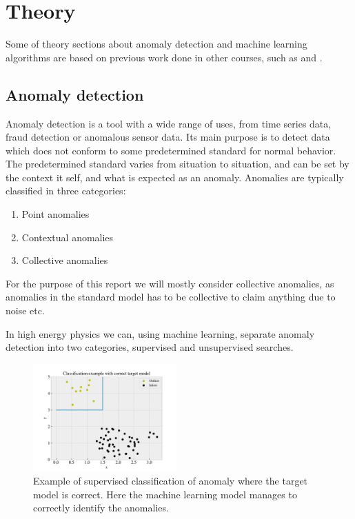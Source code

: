 \documentclass[ reprint, amsmath,amssymb, aps, nofootinbib]{revtex4-2}
\begin{document}
\section{Theory}
Some of theory sections about anomaly detection and machine learning algorithms are based on previous work done in other courses, such as \cite{FYSSTK} and \cite{ML_PROJ}.

\subsection{Anomaly detection}

Anomaly detection is a tool with a wide range of uses, from time series data, fraud detection or anomalous sensor data. Its main purpose is to detect data which does not conform to some predetermined standard for normal behavior. The predetermined standard varies from situation to situation, and can be set by the context it self, and what is expected as an anomaly. Anomalies are typically classified in three categories\cite{anom_detec}:
\begin{enumerate}
    \item Point anomalies
    \item Contextual anomalies
    \item Collective anomalies
\end{enumerate}

For the purpose of this report we will mostly consider collective anomalies, as anomalies in the standard model has to be collective to claim anything due to noise etc. \par 

In high energy physics we can, using machine learning, separate anomaly detection into two categories, supervised and unsupervised searches. 

\begin{figure}[H]
    \centering
    \includegraphics[width=0.49\textwidth]{figures/theory/correct_class.pdf}
    \caption{Example of supervised classification of anomaly where the target model is correct. Here the machine learning model manages to correctly identify the anomalies. }
    \label{fig:corr_class}
\end{figure}
\end{document}
